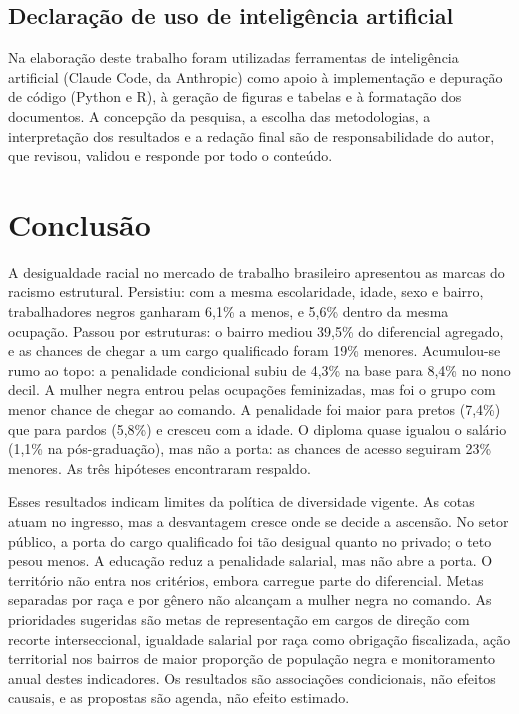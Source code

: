 \documentclass[11pt, a4paper, oneside]{article}
\begin{document}
\subsection*{Declaração de uso de inteligência artificial}
Na elaboração deste trabalho foram utilizadas ferramentas de inteligência
artificial (Claude Code, da Anthropic) como apoio à implementação e depuração de
código (Python e R), à geração de figuras e tabelas e à formatação dos documentos.
A concepção da pesquisa, a escolha das metodologias, a interpretação dos resultados
e a redação final são de responsabilidade do autor, que revisou, validou e responde
por todo o conteúdo.



\section*{Conclusão}

A desigualdade racial no mercado de trabalho brasileiro apresentou as marcas do racismo estrutural. Persistiu: com a mesma escolaridade, idade, sexo e bairro, trabalhadores negros ganharam 6,1\% a menos, e 5,6\% dentro da mesma ocupação. Passou por estruturas: o bairro mediou 39,5\% do diferencial agregado, e as chances de chegar a um cargo qualificado foram 19\% menores. Acumulou-se rumo ao topo: a penalidade condicional subiu de 4,3\% na base para 8,4\% no nono decil. A mulher negra entrou pelas ocupações feminizadas, mas foi o grupo com menor chance de chegar ao comando. A penalidade foi maior para pretos (7,4\%) que para pardos (5,8\%) e cresceu com a idade. O diploma quase igualou o salário (1,1\% na pós-graduação), mas não a porta: as chances de acesso seguiram 23\% menores. As três hipóteses encontraram respaldo.

Esses resultados indicam limites da política de diversidade vigente. As cotas atuam no ingresso, mas a desvantagem cresce onde se decide a ascensão. No setor público, a porta do cargo qualificado foi tão desigual quanto no privado; o teto pesou menos. A educação reduz a penalidade salarial, mas não abre a porta. O território não entra nos critérios, embora carregue parte do diferencial. Metas separadas por raça e por gênero não alcançam a mulher negra no comando. As prioridades sugeridas são metas de representação em cargos de direção com recorte interseccional, igualdade salarial por raça como obrigação fiscalizada, ação territorial nos bairros de maior proporção de população negra e monitoramento anual destes indicadores. Os resultados são associações condicionais, não efeitos causais, e as propostas são agenda, não efeito estimado.


\newpage


\end{document}
